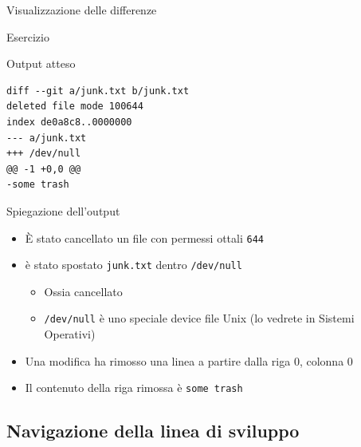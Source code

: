 \documentclass[xcolor=dvipsnames,presentation]{beamer}
\begin{document}
\begin{frame}{Visualizzazione delle differenze}
\begin{block}{Esercizio}
\begin{itemize}
        \end{itemize}
    \end{block}
    \begin{block}{Output atteso}
        \begin{Verbatim}[fontsize=\scriptsize]
diff --git a/junk.txt b/junk.txt
deleted file mode 100644
index de0a8c8..0000000
--- a/junk.txt
+++ /dev/null
@@ -1 +0,0 @@
-some trash
        \end{Verbatim}
    \end{block}
        \begin{block}{Spiegazione dell'output}
        \begin{itemize}
            \item È stato cancellato un file con permessi ottali \texttt{644}
            \item è stato spostato \texttt{junk.txt} dentro \texttt{/dev/null}
            \begin{itemize}
                \item Ossia cancellato
                \item \texttt{/dev/null} è uno speciale device file Unix (lo vedrete in Sistemi Operativi)
            \end{itemize}
            \item Una modifica ha rimosso una linea a partire dalla riga 0, colonna 0
            \item Il contenuto della riga rimossa è \texttt{some trash}
        \end{itemize}
    \end{block}
\end{frame}

\subsection{Navigazione della linea di sviluppo}
\end{document}
